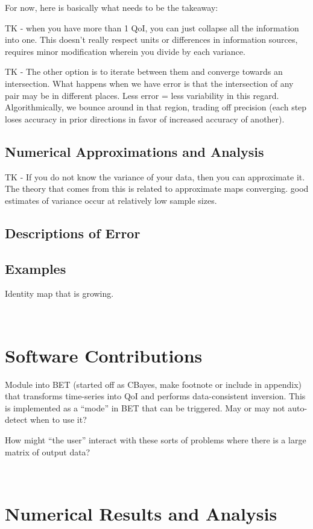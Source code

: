 For now, here is basically what needs to be the takeaway: 

TK - when you have more than 1 QoI, you can just collapse all the information into one. This doesn't really respect units or differences in information sources, requires minor modification wherein you divide by each variance.

TK - The other option is to iterate between them and converge towards an intersection. What happens when we have error is that the intersection of any pair may be in different places. Less error = less variability in this regard. 
Algorithmically, we bounce around in that region, trading off precision (each step loses accuracy in prior directions in favor of increased accuracy of another). 


\subsection{Numerical Approximations and Analysis}


TK - If you do not know the variance of your data, then you can approximate it. The theory that comes from this is related to approximate maps converging. good estimates of variance occur at relatively low sample sizes.

\subsection{Descriptions of Error}

\subsection{Examples}

Identity map that is growing. 

\
\section{Software Contributions}

Module into BET (started off as CBayes, make footnote or include in appendix) that transforms time-series into QoI and performs data-consistent inversion.
This is implemented as a ``mode'' in BET that can be triggered. 
May or may not auto-detect when to use it? 

How might ``the user'' interact with these sorts of problems where there is a large matrix of output data?

\
\section{Numerical Results and Analysis}

